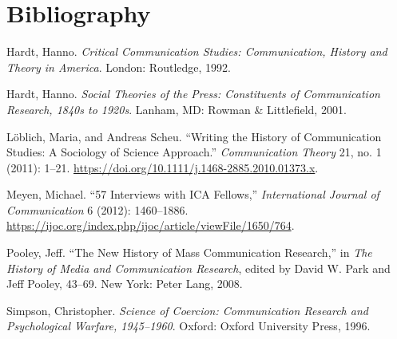 \documentclass{tufte-handout}
\begin{document}
\section{Bibliography}\label{bibliography}

\begin{hangparas}{.25in}{1} 



Hardt, Hanno. \emph{Critical Communication Studies: Communication,
History and Theory in America}. London: Routledge, 1992.

Hardt, Hanno. \emph{Social Theories of the Press: Constituents of
Communication Research, 1840s to 1920s}. Lanham, MD: Rowman \&
Littlefield, 2001.

Löblich, Maria, and Andreas Scheu. ``Writing the History of
Communication Studies: A Sociology of Science Approach.''
\emph{Communication Theory} 21, no. 1 (2011): 1--21.
\url{https://doi.org/10.1111/j.1468-2885.2010.01373.x}.

Meyen, Michael. ``57 Interviews with ICA Fellows,'' \emph{International
Journal of Communication} 6 (2012): 1460--1886.
\url{https://ijoc.org/index.php/ijoc/article/viewFile/1650/764}.

Pooley, Jeff. ``The New History of Mass Communication Research,'' in
\emph{The History of Media and Communication Research}, edited by David
W. Park and Jeff Pooley, 43--69. New York: Peter Lang, 2008.

Simpson, Christopher. \emph{Science of Coercion: Communication Research
and Psychological Warfare, 1945--1960}. Oxford: Oxford University Press,
1996.



\end{hangparas}
\end{document}
